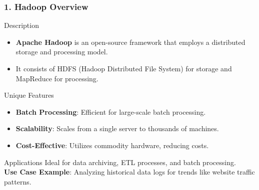 \documentclass[aspectratio=169]{beamer}
\begin{document}
\begin{frame}[fragile]
    \frametitle{1. Hadoop Overview}
    \begin{block}{Description}
        \begin{itemize}
            \item \textbf{Apache Hadoop} is an open-source framework that employs a distributed storage and processing model.
            \item It consists of HDFS (Hadoop Distributed File System) for storage and MapReduce for processing.
        \end{itemize}
    \end{block}
    
    \begin{block}{Unique Features}
        \begin{itemize}
            \item \textbf{Batch Processing}: Efficient for large-scale batch processing.
            \item \textbf{Scalability}: Scales from a single server to thousands of machines.
            \item \textbf{Cost-Effective}: Utilizes commodity hardware, reducing costs.
        \end{itemize}
    \end{block}
    
    \begin{block}{Applications}
        Ideal for data archiving, ETL processes, and batch processing.\\
        \textbf{Use Case Example}: Analyzing historical data logs for trends like website traffic patterns.
    \end{block}
\end{frame}
\end{document}
